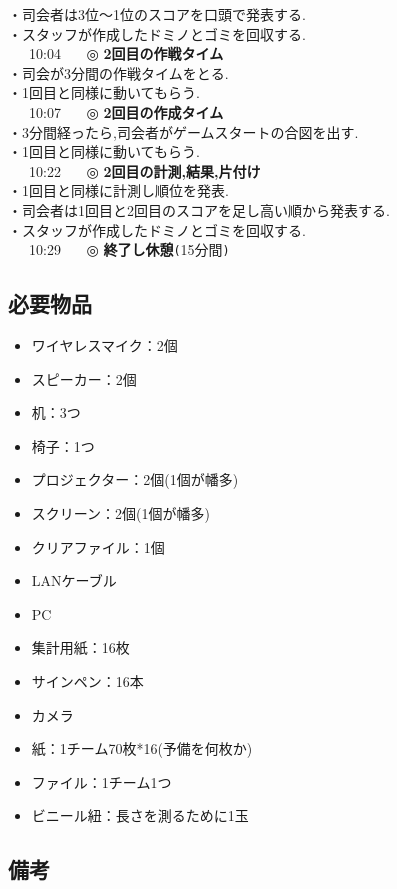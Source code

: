 \documentclass[a4j]{jarticle}
\begin{document}
\hspace{15mm}・司会者は3位〜1位のスコアを口頭で発表する.\\
\hspace{15mm}・スタッフが作成したドミノとゴミを回収する.\\
\ \ \ 10:04 \ \ \ ◎ \textbf{2回目の作戦タイム}\\
\hspace{15mm}・司会が3分間の作戦タイムをとる.\\
\hspace{15mm}・1回目と同様に動いてもらう.\\
\ \ \ 10:07 \ \ \ ◎ \textbf{2回目の作成タイム}\\
\hspace{15mm}・3分間経ったら,司会者がゲームスタートの合図を出す.\\
\hspace{15mm}・1回目と同様に動いてもらう.\\
\ \ \ 10:22 \ \ \ ◎ \textbf{2回目の計測,結果,片付け}\\
\hspace{15mm}・1回目と同様に計測し順位を発表.\\
\hspace{15mm}・司会者は1回目と2回目のスコアを足し高い順から発表する.\\
\hspace{15mm}・スタッフが作成したドミノとゴミを回収する.\\
\ \ \ 10:29 \ \ \ ◎ \textbf{終了し休憩}\verb+(+15分間\verb+)+

\subsection{必要物品}
\begin{itemize}
\item ワイヤレスマイク：2個
\item スピーカー：2個
\item 机：3つ
\item 椅子：1つ
\item プロジェクター：2個(1個が幡多)
\item スクリーン：2個(1個が幡多)
\item クリアファイル：1個
\item LANケーブル
\item PC
\item 集計用紙：16枚
\item サインペン：16本
\item カメラ
\item 紙：1チーム70枚*16(予備を何枚か)
\item ファイル：1チーム1つ
\item ビニール紐：長さを測るために1玉
\end{itemize}
\subsection{備考}
\end{document}
